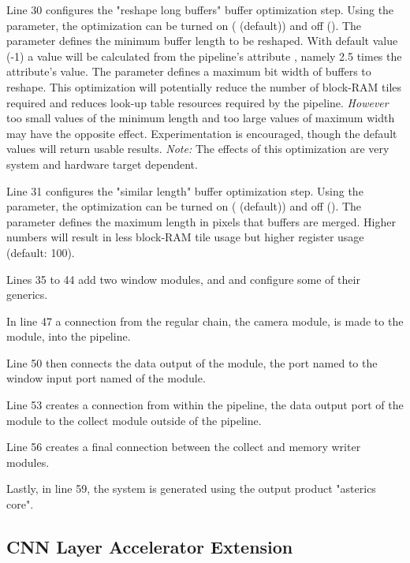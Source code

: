 Line 30 configures the "reshape long buffers" buffer optimization step.
Using the  parameter, the optimization can be turned on ( (default)) and off ().
The  parameter defines the minimum buffer length to be reshaped.
With default value (-1) a value will be calculated from the pipeline's attribute , namely 2.5 times the attribute's value.
The  parameter defines a maximum bit width of buffers to reshape.
This optimization will potentially reduce the number of block-RAM tiles required and reduces look-up table resources required by the pipeline.
\emph{However} too small values of the minimum length and too large values of maximum width may have the opposite effect.
Experimentation is encouraged, though the default values will return usable results.
\emph{Note:} The effects of this optimization are very system and hardware target dependent.

Line 31 configures the "similar length" buffer optimization step.
Using the  parameter, the optimization can be turned on ( (default)) and off ().
The  parameter defines the maximum length in pixels that buffers are merged.
Higher numbers will result in less block-RAM tile usage but higher register usage (default: 100). 

Lines 35 to 44 add two window modules,  and  and configure some of their generics.

In line 47 a connection from the regular chain, the camera module, is made to the  module, into the pipeline.

Line 50 then connects the data output of the  module, the port named  to the window input port named  of the  module.

Line 53 creates a connection from within the pipeline, the data output port  of the  module to the collect module outside of the pipeline.

Line 56 creates a final connection between the collect and memory writer modules.

Lastly, in line 59, the system is generated using the output product "asterics core".


\subsection{CNN Layer Accelerator Extension}
\label{sec:06-02-cnns}

